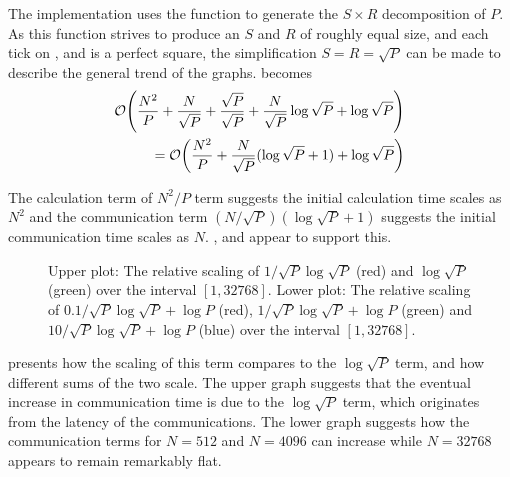 The implementation uses the \mpidimscreate{} function to generate
the $S\times{}R$ decomposition of $P$.
%
As this function strives to
produce an $S$ and $R$ of roughly equal size, and each tick on
,
 and
is a perfect square, the simplification $S = R = \sqrt{P}$
can be made to describe the general trend of the graphs.
%
becomes
\begin{equation}
    \label{eqn:replicated_systolic_pair_operation_simplified_time}
    \begin{split}
        \mathcal{O}{\left({ 
            \frac{N^2}{P}
            + \frac{N}{\sqrt{P}}
            + \frac{\sqrt{P}}{\sqrt{P}}
            + \frac{N}{\sqrt{P}}\log{\sqrt{P}}
            + \log{\sqrt{P}}
         }\right)} \\
        = \mathcal{O}{\left({ 
            \frac{N^2}{P}
            + \frac{N}{\sqrt{P}}(\log{\sqrt{P}}+1)
            + \log{\sqrt{P}}
         }\right)}
    \end{split}
\end{equation}

The calculation term of $N^2/P$ term suggests
the initial calculation time scales as $N^2$
and the communication term $(N/\sqrt{P}) (\log{\sqrt{P}}+1)$ suggests
the initial communication time scales as $N$.
%
,
 and
appear to support this.


\begin{figure}
    
    \caption{
        Upper plot: The relative scaling of
        $1/\sqrt{P}\log{\sqrt{P}}$ (red) and
        $\log{\sqrt{P}}$ (green)
        over the interval $[1,32768]$.
        Lower plot: The relative scaling of
        $0.1/\sqrt{P}\log{\sqrt{P}} + \log{P}$ (red),
        $1/\sqrt{P}\log{\sqrt{P}} + \log{P}$ (green) and
        $10/\sqrt{P}\log{\sqrt{P}} + \log{P}$ (blue)
        over the interval $[1,32768]$.
    }
    \label{fig:log_vs_log_sqrt_p}
\end{figure}

 presents how the scaling of this term compares
to the $\log{\sqrt{P}}$ term, and how different sums of the two scale.
%
The upper graph suggests that the eventual increase in communication time is
due to the $\log{\sqrt{P}}$ term, which originates from the latency
of the communications.
%
The lower graph suggests
how the communication terms for $N = 512$ and $N = 4096$ can
increase while $N = 32768$ appears to remain remarkably flat.

